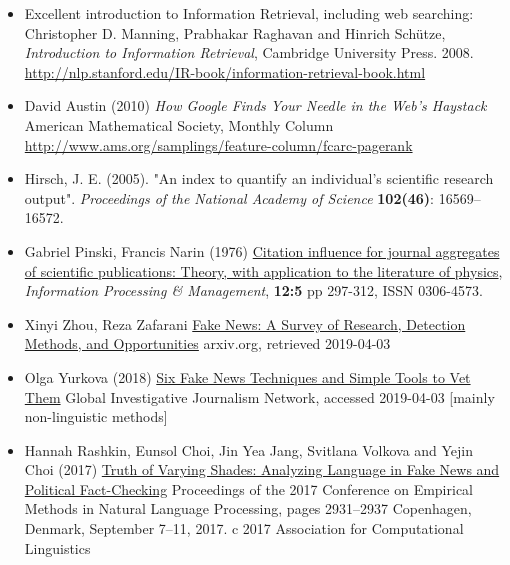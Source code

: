 \documentclass[a4paper,landscape,headrule,footrule,xetex]{foils}
\begin{document}
\begin{itemize}
\item Excellent introduction to Information Retrieval, including web searching:
\\ Christopher D. Manning, Prabhakar Raghavan and Hinrich Schütze, \textit{Introduction to Information Retrieval}, Cambridge University Press. 2008. 
\\ \url{http://nlp.stanford.edu/IR-book/information-retrieval-book.html}
\item David Austin (2010) \textit{How Google Finds Your Needle in the Web's Haystack}
American Mathematical Society, Monthly Column 
\\ \url{http://www.ams.org/samplings/feature-column/fcarc-pagerank}
\item Hirsch, J. E. (2005). "An index to quantify an individual's scientific research output". \textit{Proceedings of the National Academy of Science} \textbf{102(46)}: 16569–16572. 
\item Gabriel Pinski, Francis Narin (1976)
\href{https://doi.org/10.1016/0306-4573(76)90048-0}{Citation influence for journal aggregates of scientific publications: Theory, with application to the literature of physics},
\textit{Information Processing \& Management},
\textbf{12:5}  pp 297-312, ISSN 0306-4573.

\item Xinyi Zhou, Reza Zafarani \href{https://arxiv.org/abs/1812.00315}{Fake News: A Survey of Research, Detection Methods, and Opportunities} arxiv.org, retrieved 2019-04-03
\item Olga Yurkova (2018) \href{https://gijn.org/six-fake-news-techniques-and-simple-tools-to-vet-them/}{Six Fake News Techniques and Simple Tools to Vet Them} Global Investigative Journalism Network, accessed 2019-04-03 [mainly non-linguistic methods]
\item  Hannah Rashkin, Eunsol Choi, Jin Yea Jang, Svitlana Volkova and Yejin Choi (2017) \href{https://www.aclweb.org/anthology/D17-1317/}{Truth of Varying Shades: Analyzing Language in Fake News and Political Fact-Checking} Proceedings of the 2017 Conference on Empirical Methods in Natural Language Processing, pages 2931–2937 Copenhagen, Denmark, September 7–11, 2017. c 2017 Association for Computational Linguistics

\end{itemize}
\end{document}
